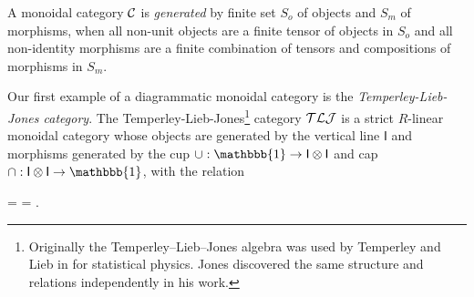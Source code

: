 \begin{definition}
    A monoidal category $\mathcal{C}$ is \textit{generated} by finite set $S_o$ of objects and $S_m$ of morphisms, when all non-unit objects are a finite tensor of objects in $S_o$ and all non-identity morphisms are a finite combination of tensors and compositions of morphisms in $S_m$.
\end{definition}

\begin{example}
    \label{eg:tlj-category}
    Our first example of a diagrammatic monoidal category is the \textit{Temperley-Lieb-Jones category}. The Temperley-Lieb-Jones\footnote{Originally the Temperley--Lieb--Jones algebra was used by Temperley and Lieb in \cite{temperley-lieb-algebra-lattices} for statistical physics. Jones discovered the same structure and relations independently in his work.} category $\mathcal{TLJ}$ is a strict $R$-linear monoidal category whose objects are generated by the vertical line $\mathsf{I}$ and morphisms generated by the cup $\cup: \mathbbb{1} \to \mathsf{I} \tensor \mathsf{I}$ and cap $\cap: \mathsf{I} \tensor \mathsf{I} \to \mathbbb{1}$, with the relation
    \begin{center}
        = 
        = .
    \end{center}





\end{example}


















